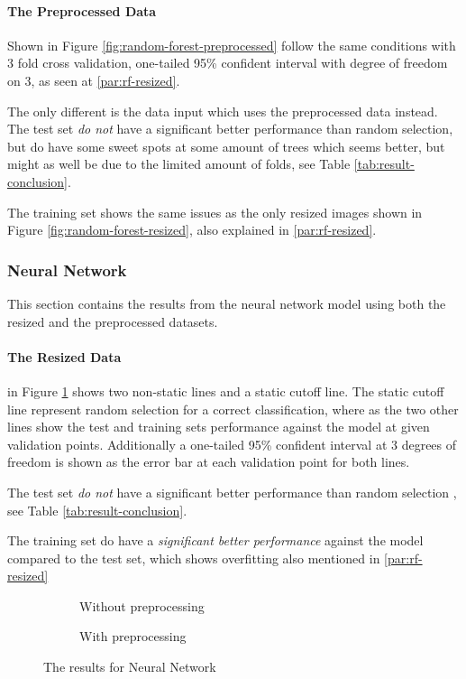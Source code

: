 \paragraph{The Preprocessed Data}
Shown in Figure \ref{fig:random-forest-preprocessed} follow the same conditions with 3 fold cross validation, one-tailed 95\% confident interval with degree of freedom on 3, as seen at \ref{par:rf-resized}.

The only different is the data input which uses the preprocessed data instead.
The test set \emph{do not} have a significant better performance than random selection, but do have some sweet spots at some amount of trees which seems better, but might as well be due to the limited amount of folds, see Table \ref{tab:result-conclusion}.

The training set shows the same issues as the only resized images shown in Figure \ref{fig:random-forest-resized}, also explained in \ref{par:rf-resized}.

\subsubsection{Neural Network}
\label{subsubsec:neuralnetwork}
This section contains the results from the neural network model using both the resized and the preprocessed datasets.

\paragraph{The Resized Data}
in Figure \ref{fig:nn-resized} shows two non-static lines and a static cutoff line.
The static cutoff line represent random selection for a correct classification, where as the two other lines show the test and training sets performance against the model at given validation points. Additionally a one-tailed 95\% confident interval at 3 degrees of freedom is shown as the error bar at each validation point for both lines.

The test set \emph{do not} have a significant better performance than random selection
, see Table \ref{tab:result-conclusion}.

The training set do have a \emph{significant better performance} against the model compared to the test set, which shows overfitting also mentioned in \ref{par:rf-resized}


\begin{figure*}
  \centering
    \begin{subfigure}{.5\linewidth}
      \centering
      \caption{Without preprocessing}
      \label{fig:nn-resized}
    \end{subfigure}%
    \begin{subfigure}{.5\linewidth}
      \centering
      \caption{With preprocessing}
      \label{fig:nn-preprocessed}
    \end{subfigure}
  \caption{The results for Neural Network}
  \label{fig:neural-network}
\end{figure*}

